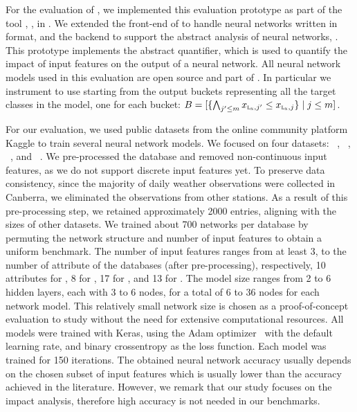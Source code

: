 For the evaluation of \changesname, we implemented this evaluation prototype as part of the tool \impatto\sidenote{\impattourl}, \cf{} , in \python{}.
We extended the front-end of \impatto{} to handle neural networks written in \python{} format, and the backend to support the abstract analysis of neural networks, \cf{} . This prototype implements the \abstractchangesname{} abstract quantifier, which is used to quantify the impact of input features on the output of a neural network. All neural network models used in this evaluation are open source and part of \impatto.
In particular we instrument \impatto{} to use \abstractchangesname{} starting from the output buckets representing all the target classes in the model, one for each bucket: $B = [\{\bigwedge_{j'\le m} x_{\normalfont \normalfont \textup{\textsc{l}}_{\normalfont \textup{\textsc{n}}}, j'}\le x_{\normalfont \normalfont \textup{\textsc{l}}_{\normalfont \textup{\textsc{n}}}, j}\}\mid j\le m]$.


For our evaluation, we used public datasets from the online community platform Kaggle to train several neural network models.
We focused on four datasets: \wine~, \diabetes~, \rain~, and \princess~.
We pre-processed the \rain{} database and removed non-continuous input features, as we do not support discrete input features yet.
To preserve data consistency, since the majority of daily weather observations were collected in Canberra, we eliminated the observations from other stations.
As a result of this pre-processing step, we retained approximately 2000 entries, aligning with the sizes of other datasets.
We trained about 700 networks per database by permuting the network structure and number of input features to obtain a uniform benchmark.
The number of input features ranges from at least 3, to the number of attribute of the databases (after pre-processing),
respectively, 10 attributes for \wine, 8 for \diabetes, 17 for \rain, and 13 for \princess.
The model size ranges from 2 to 6 hidden layers, each with 3 to 6 nodes, for a total of 6 to 36 nodes for each network model.
This relatively small network size is chosen as a proof-of-concept evaluation to study \changesname{} without the need for extensive computational resources.
All models were trained with Keras, using the Adam optimizer~ with the default learning rate, and binary crossentropy as the loss function. Each model was trained for 150 iterations.
The obtained neural network accuracy usually depends on the chosen subset of input features which is usually lower than the accuracy achieved in the literature.
However, we remark that our study focuses on the impact analysis, therefore high accuracy is not needed in our benchmarks.

